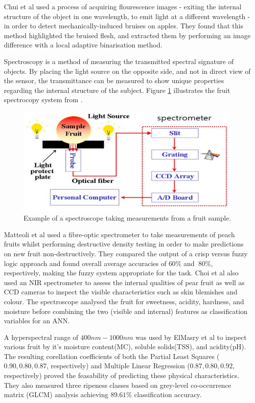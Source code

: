 \documentclass[fleqn,twoside]{article}
\begin{document}
Chui et al \cite{chiu} used a process of acquiring flourescence images - exiting the internal structure of the object in one wavelength, to emit light at a different wavelength - in order to detect mechanically-induced bruises on apples. They found that this method highlighted the bruised flesh, and extracted them by performing an image difference with a local adaptive binarisation method. 


Spectroscopy is a method of measuring the transmitted spectral signature of objects. By placing the light source on the opposite side, and not in direct view of the sensor, the transmittance can be measured to show unique properties regarding the internal structure of the subject. Figure \ref{fig:spectroscope} illustrates the fruit spectrocopy system from \cite{choi}. 

\begin{figure}[h]
	\centering
	\includegraphics[width=0.7\linewidth]{spectroscope.png}
	\caption{Example of a spectroscope taking measurements from a fruit sample.}
	\label{fig:spectroscope}
\end{figure}%


Matteoli et al \cite{matteoli} used a fibre-optic spectrometer to take measurements of peach fruits whilst performing destructive density testing in order to make predictions on new fruit non-destructively. They compared the output of a crisp versus fuzzy logic approach and found overall average accuracies of $60\%$ and $~80\%$, respectively, making the fuzzy system appropriate for the task. Choi et al \cite{choi} also used an NIR spectrometer to assess the internal qualities of pear fruit as well as CCD cameras to inspect the visible characteristics such as skin blemishes and colour. The spectroscope analysed the fruit for sweetness, acidity, hardness, and moisture before combining the two (visible and internal) features as classification variables for an ANN. 

A hyperspectral range of $400nm-1000nm$ was used by ElMasry et al \cite{elmasry2} to inspect various fruit by it's moisture content(MC), soluble solids(TSS), and acidity(pH). The resulting corellation coefficients of both the Partial Least Squares ($0.90, 0.80, 0.87$, respectively) and Multiple Linear Regression ($0.87, 0.80, 0.92$, respectively) proved the feasability of predicting these physical characteristics. They also measured three ripeness classes based on grey-level co-occurrence matrix (GLCM) analysis achieving $89.61\%$ classification accuracy.
\end{document}
